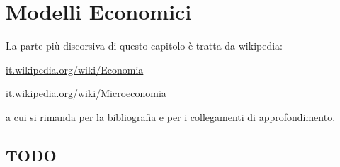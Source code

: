 
\chapter{Modelli Economici}

La parte più discorsiva di questo capitolo è tratta da wikipedia:

\url{it.wikipedia.org/wiki/Economia}

\url{it.wikipedia.org/wiki/Microeconomia}

a cui si rimanda per la bibliografia e per i collegamenti di approfondimento.

\section{TODO}

\begin{comment}
 
Introduzione
  Micro economia
  Macro economia
  Variabili discrete
I mercati
  bene
  mercato
  consumatore
  produttore
  concorrenza perfetta
  monopolio
  oligopolio
  concorrenza monopolistica
Funzione di domanda e offerta
  leggi della domanda
    domanda
    offerta
    d=f(p) p>0 decrescente
      modello lineare
      modello parabolico
      modello esponenziale
      modello iperbolico
    esempi
    elasticità della domanda
      totalmente elastica
      elastica
      unitaria
      rigida
      totalmente rigida
  leggi dell'offerta
    r=f(p) p>0 crescente
    coefficiente di elasticità dell'offerta (positivo)
      elastica
      unitaria
      rigida
Legge di mercato
  Regime di concorrenza perfetta
    condizioni
      molti consumatori
      molti produttori
      libertà di acquisto e di vendita
      ogni operatore può entrare o uscire dal mercato 
      c'è trasparenza
      non ci sono coalizioni
      prodotti a larga diffusione
    prezzo di equilibrio
  Cambiamento del prezzo di equilibrio
    a parità di domanda
    a parità di offerta
    con cambiamento sia di domanda sia di offerta
Funzione di utilità
  paniere di consumo
    relazione tra panieri
      preferito
      indifferente
    proprietà
      riflessiva
      transitiva
      completezza
      continuità
      non sazietà
      stretta convessità
    funzione di utilità
      curva di livello o curve di indifferenza
      saggio marginale di sostituzione
        caratteristiche delle curve di indifferenza
          decrescenti
          concavità verso l'alto
          non si intersecano
          curve più alte->soddisfazione più elevata
        casi estremi
          sostituti perfetti
          complementari perfetti

\end{comment}


